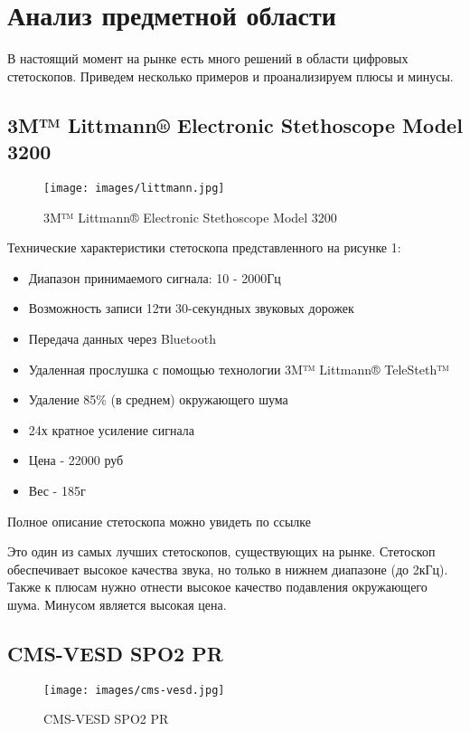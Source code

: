\documentclass[../main.tex]{subfiles}
\begin{document}
\section{Анализ предметной области}

В настоящий момент на рынке есть много решений в области цифровых стетоскопов. Приведем несколько примеров и проанализируем плюсы и минусы.

\subsection{3M™ Littmann® Electronic Stethoscope Model 3200}
\begin{figure}[H]
\centering
\texttt{[image: images/littmann.jpg]}
\caption{3M™ Littmann® Electronic Stethoscope Model 3200}
\end{figure}

Технические характеристики стетоскопа представленного на рисунке 1:
\begin{itemize}
  \item Диапазон принимаемого сигнала: 10 - 2000Гц
  \item Возможность записи 12ти 30-секундных звуковых дорожек
  \item Передача данных через Bluetooth
  \item Удаленная прослушка с помощью технологии 3M™ Littmann® TeleSteth™
  \item Удаление 85\% (в среднем) окружающего шума
  \item 24х кратное усиление сигнала
  \item Цена - 22000 руб
  \item Вес - 185г
\end{itemize}

Полное описание стетоскопа можно увидеть по ссылке \cite{littmann}

Это один из самых лучших стетоскопов, существующих на рынке. Стетоскоп обеспечивает высокое качества звука, но только в нижнем диапазоне (до 2кГц). Также к плюсам нужно отнести высокое качество подавления окружающего шума. Минусом является высокая цена.

\subsection{CMS-VESD SPO2 PR}
\begin{figure}[H]
\centering
\texttt{[image: images/cms-vesd.jpg]}
\caption{CMS-VESD SPO2 PR}
\end{figure}
\end{document}
